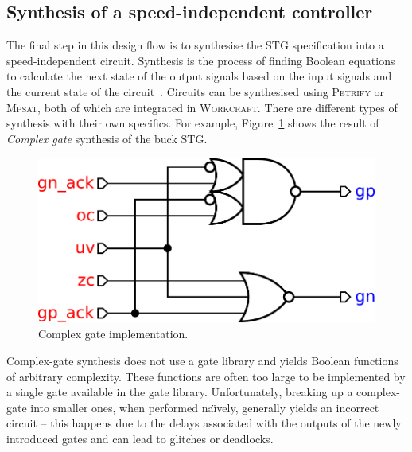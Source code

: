 \documentclass[british, journal]{IEEEtran}
\newcommand{\noun}[1]{\textsc{#1}}
\begin{document}

\subsection{Synthesis of a speed-independent controller}


The final step in this design flow is to synthesise the STG specification into
a speed-independent circuit. Synthesis is the process of finding Boolean
equations
to calculate the next state of the output signals based on the input signals
and the current state of the circuit~\cite{Cortadella}. Circuits can be
synthesised using \noun{Petrify} or \noun{Mpsat}, both of which are
integrated in \noun{Workcraft}. There are different types of synthesis
with their own specifics. For example, Figure~\ref{fig:complex-gate-circuit}
shows the result of \emph{Complex gate} synthesis of the buck STG.

\begin{figure}[h]
\begin{centering}
\includegraphics[scale=0.3]{Images/complex-gate-circuit-buck}
\par\end{centering}

\protect\caption{\label{fig:complex-gate-circuit}Complex gate implementation.}
\end{figure}

Complex-gate synthesis does not use a gate library and yields Boolean functions
of arbitrary complexity.
These functions are often too large to be implemented by a single gate available
in the gate library.
Unfortunately, breaking up a complex-gate into smaller ones, when performed
na\"{\i}vely, generally yields
an incorrect circuit -- this happens due to the delays associated with the
outputs of the newly introduced gates and can lead to glitches or deadlocks.
\end{document}
